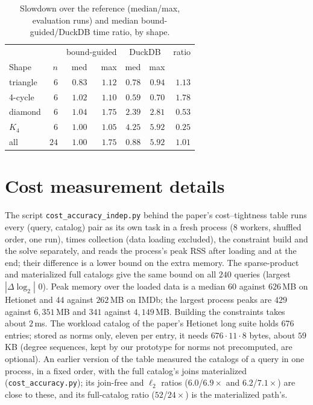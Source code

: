 \documentclass[11pt]{article}
\begin{document}
\begin{table}[h]
\centering
\caption{Slowdown over the reference (median/max, evaluation runs) and
median bound-guided/DuckDB time ratio, by shape.}
\label{tab:robust-shape}
\small\setlength{\tabcolsep}{3pt}
\begin{tabular}{@{}lrrrrrr@{}}
\toprule
 & & \multicolumn{2}{c}{bound-guided} & \multicolumn{2}{c}{DuckDB} & ratio \\
Shape & $n$ & med & max & med & max & \\
\midrule
triangle & $6$ & $0.83$ & $1.12$ & $0.78$ & $0.94$ & $1.13$ \\
4-cycle & $6$ & $1.02$ & $1.10$ & $0.59$ & $0.70$ & $1.78$ \\
diamond & $6$ & $1.04$ & $1.75$ & $2.39$ & $2.81$ & $0.53$ \\
$K_4$ & $6$ & $1.00$ & $1.05$ & $4.25$ & $5.92$ & $0.25$ \\
\midrule
all & $24$ & $1.00$ & $1.75$ & $0.88$ & $5.92$ & $1.01$ \\
\bottomrule
\end{tabular}
\end{table}

\section{Cost measurement details}
The script \texttt{cost\_accuracy\_indep.py} behind the paper's
cost--tightness table runs every (query, catalog) pair as its own task in a fresh
process ($8$ workers, shuffled order, one run), times collection (data loading excluded), the
constraint build and the solve separately, and reads the process's peak
RSS after loading and at the end; their difference is a lower bound on the extra memory. The sparse-product and materialized full
catalogs give the same bound on all $240$ queries (largest $|\Delta\log_2|$
$0$). Peak memory over the loaded data is a median $60$ against $626$\,MB
on Hetionet and $44$ against $262$\,MB on IMDb; the largest process peaks
are $429$ against $6{,}351$\,MB and $341$ against $4{,}149$\,MB. Building the
constraints takes about $2$\,ms. The workload catalog of the paper's Hetionet long suite holds $676$ entries; stored as norms only, eleven per entry, it needs $676\cdot 11\cdot 8$ bytes, about $59$\,KB (degree sequences, kept by our prototype for norms not precomputed, are optional). An earlier version of the table measured
the catalogs of a query in one process, in a fixed order, with the full
catalog's joins materialized (\texttt{cost\_accuracy.py}); its
join-free and $\ell_2$ ratios ($6.0$/$6.9\times$ and $6.2$/$7.1\times$) are
close to these, and its full-catalog ratio ($52$/$24\times$) is the
materialized path's.
\end{document}
